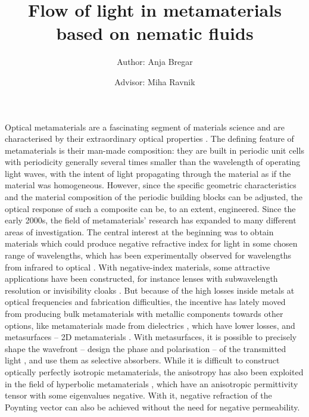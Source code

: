 \documentclass[a4paper,11pt]{article}
\title{\huge{Flow of light in metamaterials based on nematic fluids}}
\author{Author: Anja Bregar \and Advisor: Miha Ravnik}
\begin{document}
\onehalfspacing

\maketitle

% 
% 
% 
%




Optical metamaterials are a fascinating segment of materials science and are characterised by their extraordinary optical properties \cite{wegener-2011-nature-review}.
The defining feature of metamaterials is their man-made composition: they are built in periodic unit cells with periodicity generally several times smaller than the wavelength of operating light waves, with the intent of light propagating through the material as if the material was homogeneous. 
However, since the specific geometric characteristics and the material composition of the periodic building blocks can be adjusted, the optical response of such a composite can be, to an extent, engineered. 
Since the early 2000s, the field of metamaterials' research has expanded to many different areas of investigation. 
The central interest at the beginning was to obtain materials which could produce negative refractive index for light in some chosen range of wavelengths, which has been experimentally observed for wavelengths from infrared to optical \cite{schultz-2000-first-mtm,zhang-2008-fishnet}. 
With negative-index materials, some attractive applications have been constructed, for instance lenses with subwavelength resolution or invisibility cloaks \cite{capasso-2016-metalens,zhang-2015-skin-cloak}. 
But because of the high losses inside metals at optical frequencies and fabrication difficulties, the incentive has lately moved from producing bulk metamaterials with metallic components towards other options, like metamaterials made from dielectrics \cite{jacob-2016-all-dielectric}, which have lower losses, and metasurfaces -- 2D metamaterials \cite{capasso-2014-flat-optics-metasurface}. 
With metasurfaces, it is possible to precisely shape the wavefront -- design the phase and polarisation -- of the transmitted light \cite{capasso-2014-flat-optics-metasurface}, and use them as selective absorbers. 
While it is difficult to construct optically perfectly isotropic metamaterials, the anisotropy has also been exploited in the field of hyperbolic metamaterials \cite{kivshar-2013-hyperbolic}, which have an anisotropic permittivity tensor with some eigenvalues negative. 
With it, negative refraction of the Poynting vector can also be achieved without the need for negative permeability.
\end{document}
